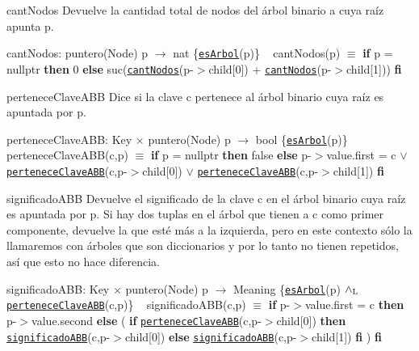 \begin{DoxyParagraph}{cant\+Nodos}
Devuelve la cantidad total de nodos del árbol binario a cuya raíz apunta p.

cant\+Nodos\+: puntero(\+Node) p $\to$ nat \{\href{axiomas.html#esArbol}{\tt es\+Arbol}(p)\} ~\newline
 cant\+Nodos(p) $\equiv$ {\bfseries if} p = nullptr {\bfseries then} 0 {\bfseries else} suc(\href{axiomas.html#cantNodos}{\tt cant\+Nodos}(p-\/$>$child\mbox{[}0\mbox{]}) + \href{axiomas.html#cantNodos}{\tt cant\+Nodos}(p-\/$>$child\mbox{[}1\mbox{]})) {\bfseries fi} 


\end{DoxyParagraph}
\begin{DoxyParagraph}{pertenece\+Clave\+A\+BB}
Dice si la clave c pertenece al árbol binario cuya raíz es apuntada por p.

pertenece\+Clave\+A\+BB\+: Key $\times$ puntero(\+Node) p $\to$ bool \{\href{axiomas.html#esArbol}{\tt es\+Arbol}(p)\} ~\newline
 pertenece\+Clave\+A\+B\+B(c,p) $\equiv$ {\bfseries if} p = nullptr {\bfseries then} false {\bfseries else} p-\/$>$value.\+first = c $\lor$ \href{axiomas.html#perteneceClaveABB}{\tt pertenece\+Clave\+A\+BB}(c,p-\/$>$child\mbox{[}0\mbox{]}) $\lor$ \href{axiomas.html#perteneceClaveABB}{\tt pertenece\+Clave\+A\+BB}(c,p-\/$>$child\mbox{[}1\mbox{]}) {\bfseries fi} 


\end{DoxyParagraph}
\begin{DoxyParagraph}{significado\+A\+BB}
Devuelve el significado de la clave c en el árbol binario cuya raíz es apuntada por p. Si hay dos tuplas en el árbol que tienen a c como primer componente, devuelve la que esté más a la izquierda, pero en este contexto sólo la llamaremos con árboles que son diccionarios y por lo tanto no tienen repetidos, así que esto no hace diferencia.

significado\+A\+BB\+: Key $\times$ puntero(\+Node) p $\to$ Meaning \{\href{axiomas.html#esArbol}{\tt es\+Arbol}(p) $\land_{\rm L}$ \href{axiomas.html#perteneceClaveABB}{\tt pertenece\+Clave\+A\+BB}(c,p)\} ~\newline
 significado\+A\+B\+B(c,p) $\equiv$ {\bfseries if} p-\/$>$value.\+first = c {\bfseries then} p-\/$>$value.\+second {\bfseries else} ( {\bfseries if} \href{axiomas.html#perteneceClaveABB}{\tt pertenece\+Clave\+A\+BB}(c,p-\/$>$child\mbox{[}0\mbox{]}) {\bfseries then} \href{axiomas.html#significadoABB}{\tt significado\+A\+BB}(c,p-\/$>$child\mbox{[}0\mbox{]}) {\bfseries else} \href{axiomas.html#significadoABB}{\tt significado\+A\+BB}(c,p-\/$>$child\mbox{[}1\mbox{]}) {\bfseries fi} ) {\bfseries fi} 


\end{DoxyParagraph}
